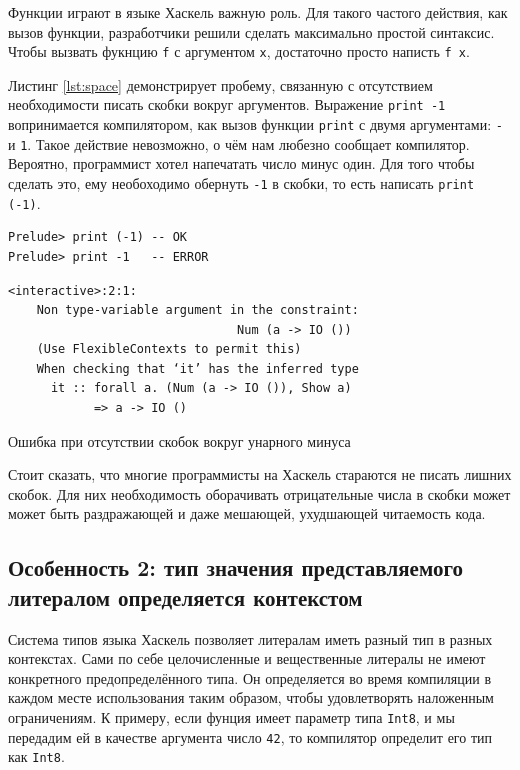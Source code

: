 Функции играют в языке Хаскель важную роль. Для такого частого действия, как
вызов функции, разработчики решили сделать максимально простой синтаксис.
Чтобы вызвать фукнцию \texttt{f} с аргументом \texttt{x}, достаточно просто
написть \texttt{f x}.

Листинг \ref{lst:space} демонстрирует пробему, связанную с отсутствием
необходимости писать скобки вокруг аргументов. Выражение \texttt{print -1}
вопринимается компилятором, как вызов функции \texttt{print} с двумя
аргументами: \texttt{-} и \texttt{1}. Такое действие невозможно, о чём нам
любезно сообщает компилятор. Вероятно, программист хотел напечатать число минус
один. Для того чтобы сделать это, ему необоходимо обернуть \texttt{-1} в
скобки, то есть написать \texttt{print (-1)}.

\begin{ListingEnv}[H]
\begin{lstlisting}
Prelude> print (-1) -- OK
Prelude> print -1   -- ERROR
\end{lstlisting}
\begin{verbatim}
<interactive>:2:1:
    Non type-variable argument in the constraint:
                                Num (a -> IO ())
    (Use FlexibleContexts to permit this)
    When checking that ‘it’ has the inferred type
      it :: forall a. (Num (a -> IO ()), Show a)
            => a -> IO ()
\end{verbatim}
\caption{Ошибка при отсутствии скобок вокруг унарного минуса}
\label{lst:space}
\end{ListingEnv}

Стоит сказать, что многие программисты на Хаскель стараются не писать лишних
скобок. Для них необходимость оборачивать отрицательные числа в скобки может
может быть раздражающей и даже мешающей, ухудшающей читаемость кода.

\subsection{Особенность 2: тип значения представляемого литералом определяется
контекстом}

Система типов языка Хаскель позволяет литералам иметь разный тип в разных
контекстах. Сами по себе целочисленные и вещественные литералы не имеют
конкретного предопределённого типа. Он определяется во время компиляции в
каждом месте использования таким образом, чтобы удовлетворять наложенным
ограничениям. К примеру, если фунция имеет параметр типа \texttt{Int8}, и мы
передадим ей в качестве аргумента число \texttt{42}, то компилятор определит
его тип как \texttt{Int8}.

